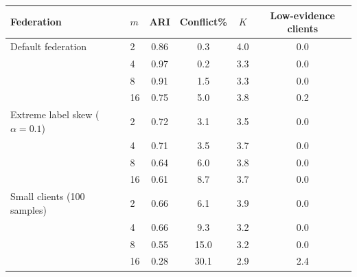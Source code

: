 \scriptsize
\setlength{\tabcolsep}{4pt}
\begin{tabular}{llcccc}
\toprule
Federation & $m$ & ARI & Conflict\% & $K$ & Low-evidence clients \\
\midrule
Default federation & 2 & 0.86 & 0.3 & 4.0 & 0.0 \\
 & 4 & 0.97 & 0.2 & 3.3 & 0.0 \\
 & 8 & 0.91 & 1.5 & 3.3 & 0.0 \\
 & 16 & 0.75 & 5.0 & 3.8 & 0.2 \\
\midrule
Extreme label skew ($\alpha=0.1$) & 2 & 0.72 & 3.1 & 3.5 & 0.0 \\
 & 4 & 0.71 & 3.5 & 3.7 & 0.0 \\
 & 8 & 0.64 & 6.0 & 3.8 & 0.0 \\
 & 16 & 0.61 & 8.7 & 3.7 & 0.0 \\
\midrule
Small clients (100 samples) & 2 & 0.66 & 6.1 & 3.9 & 0.0 \\
 & 4 & 0.66 & 9.3 & 3.2 & 0.0 \\
 & 8 & 0.55 & 15.0 & 3.2 & 0.0 \\
 & 16 & 0.28 & 30.1 & 2.9 & 2.4 \\
\bottomrule
\end{tabular}
